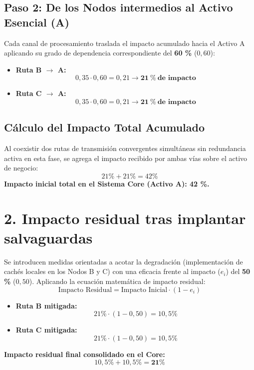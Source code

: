 \documentclass[11pt,a4paper]{article}
\begin{document}
\subsection*{Paso 2: De los Nodos intermedios al Activo Esencial (A)}
Cada canal de procesamiento traslada el impacto acumulado hacia el Activo A aplicando su grado de dependencia correspondiente del \textbf{60 \%} ($0,60$):
\begin{itemize}
    \item \textbf{Ruta B $\rightarrow$ A:} \[ 0,35 \cdot 0,60 = 0,21 \rightarrow \mathbf{21\ \%\ \text{de impacto}} \]
    \item \textbf{Ruta C $\rightarrow$ A:} \[ 0,35 \cdot 0,60 = 0,21 \rightarrow \mathbf{21\ \%\ \text{de impacto}} \]
\end{itemize}

\subsection*{Cálculo del Impacto Total Acumulado}
Al coexistir dos rutas de transmisión convergentes simultáneas sin redundancia activa en esta fase, se agrega el impacto recibido por ambas vías sobre el activo de negocio:
\[ 21\% + 21\% = 42\% \]
\textbf{Impacto inicial total en el Sistema Core (Activo A): 42 \%.}

\section*{2. Impacto residual tras implantar salvaguardas}
Se introducen medidas orientadas a acotar la degradación (implementación de cachés locales en los Nodos B y C) con una eficacia frente al impacto ($e_i$) del \textbf{50 \%} ($0,50$). Aplicando la ecuación matemática de impacto residual:
\[ \text{Impacto Residual} = \text{Impacto Inicial} \cdot (1 - e_i) \]

\begin{itemize}
    \item \textbf{Ruta B mitigada:} \[ 21\% \cdot (1 - 0,50) = 10,5\% \]
    \item \textbf{Ruta C mitigada:} \[ 21\% \cdot (1 - 0,50) = 10,5\% \]
\end{itemize}
\textbf{Impacto residual final consolidado en el Core:} \[ 10,5\% + 10,5\% = \mathbf{21\%} \]

\pagebreak

\end{document}
